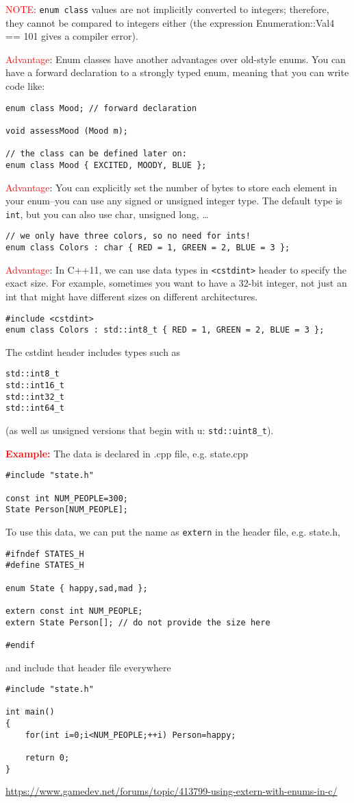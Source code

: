 \textcolor{red}{NOTE}: \verb!enum class! values are not implicitly converted to
integers; therefore, they cannot be compared to integers either (the expression
Enumeration::Val4 == 101 gives a compiler error).

\textcolor{red}{Advantage}: Enum classes have another advantages over old-style
enums. You can have a forward declaration to a strongly typed enum, meaning that
you can write code like:
\begin{verbatim}
enum class Mood; // forward declaration
 
void assessMood (Mood m);
  
// the class can be defined later on:
enum class Mood { EXCITED, MOODY, BLUE };
\end{verbatim}

\textcolor{red}{Advantage}: You can explicitly set the number of bytes to store
each element in your enum--you can use any signed or unsigned integer type.
The default type is \verb!int!, but you can also use char, unsigned long, \ldots
\begin{verbatim}
// we only have three colors, so no need for ints!
enum class Colors : char { RED = 1, GREEN = 2, BLUE = 3 };
\end{verbatim}

\textcolor{red}{Advantage}: In C++11, we can use data types in \verb!<cstdint>!
header to specify the exact size. For example, sometimes you want to have a
32-bit integer, not just an int that might have different sizes on different
architectures.
\begin{verbatim}
#include <cstdint>
enum class Colors : std::int8_t { RED = 1, GREEN = 2, BLUE = 3 };
\end{verbatim} 
The cstdint header includes types such as 
\begin{verbatim}
std::int8_t
std::int16_t
std::int32_t
std::int64_t 
\end{verbatim}
(as well as unsigned versions that begin with u: \verb!std::uint8_t!).


\textcolor{red}{\bf Example:}
The data is declared in .cpp file, e.g. state.cpp
\begin{lstlisting}
#include "state.h"

const int NUM_PEOPLE=300;
State Person[NUM_PEOPLE];
\end{lstlisting}

To use this data, we can put the name as \verb!extern! in the header file, e.g. state.h, 
\begin{lstlisting}
#ifndef STATES_H
#define STATES_H

enum State { happy,sad,mad };

extern const int NUM_PEOPLE;
extern State Person[]; // do not provide the size here

#endif
\end{lstlisting}
and include that header file everywhere
\begin{lstlisting}
#include "state.h"

int main()
{
    for(int i=0;i<NUM_PEOPLE;++i) Person=happy;

    return 0;
}
\end{lstlisting}
\url{https://www.gamedev.net/forums/topic/413799-using-extern-with-enums-in-c/}

